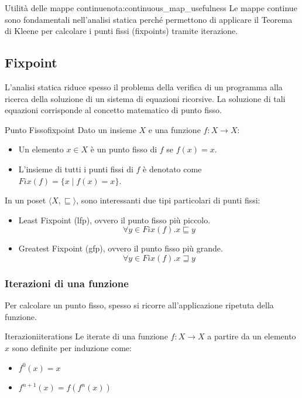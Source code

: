 \begin{nota}{Utilità delle mappe continue}{nota:continuous_map_usefulness}
Le mappe continue sono fondamentali nell'analisi statica perché permettono di
applicare il Teorema di Kleene per calcolare i punti fissi (fixpoints)
tramite iterazione.
\end{nota}

\subsection{Fixpoint}\label{subsec:fixpoint}

L'analisi statica riduce spesso il problema della verifica di un programma
alla ricerca della soluzione di un sistema di equazioni ricorsive.
La soluzione di tali equazioni corrisponde al concetto matematico di punto
fisso.

\begin{definizione}{Punto Fisso}{fixpoint}
Dato un insieme $X$ e una funzione $f: X \to X$:
\begin{itemize}
    \item Un elemento $x \in X$ è un punto fisso di $f$ se $f(x) = x$.
    \item L'insieme di tutti i punti fissi di $f$ è denotato come
    $Fix(f) = \{ x \mid f(x) = x \}$.
\end{itemize}
\end{definizione}

In un poset $\langle X, \sqsubseteq \rangle$, sono interessanti due tipi
particolari di punti fissi:
\begin{itemize}
    \item Least Fixpoint (lfp), ovvero il punto fisso più piccolo.
    \[ \forall y \in Fix(f) . x \sqsubseteq y \]
    \item Greatest Fixpoint (gfp), ovvero il punto fisso più grande.
    \[ \forall y \in Fix(f) . x \sqsupseteq y \]
\end{itemize}

\subsubsection{Iterazioni di una funzione}

Per calcolare un punto fisso, spesso si ricorre all'applicazione ripetuta
della funzione.

\begin{definizione}{Iterazioni}{iterations}
Le iterate di una funzione $f: X \to X$ a partire da un elemento $x$ sono
definite per induzione come:
\begin{itemize}
    \item $f^0(x) = x$
    \item $f^{n+1}(x) = f(f^n(x))$
\end{itemize}
\end{definizione}

